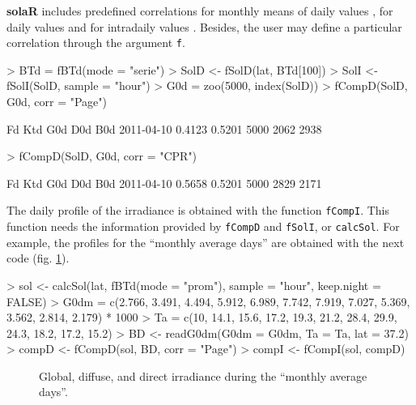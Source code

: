 \documentclass[a4paper]{article}
\renewenvironment{Schunk}{\vspace{\topsep}}{\vspace{\topsep}}
\newcommand{\code}[1]{{\texttt{#1}}}
\newcommand{\pkg}[1]{{\textbf{#1}}}
\begin{document}
\pkg{solaR} includes predefined correlations for monthly means of
daily values \cite{Page1961, Liu.Jordan1960}, for daily values
\cite{Collares-Pereira.Rabl1979,Erbs.Klein.ea1982,Miguel.Bilbao.ea2001}
and for intradaily values \cite{Ridley.Boland.ea2010}.  Besides, the
user may define a particular correlation through the argument
\code{f}.

\begin{Schunk}
\begin{Sinput}
> BTd = fBTd(mode = "serie")
> SolD <- fSolD(lat, BTd[100])
> SolI <- fSolI(SolD, sample = "hour")
> G0d = zoo(5000, index(SolD))
> fCompD(SolD, G0d, corr = "Page")
\end{Sinput}
\begin{Soutput}
               Fd    Ktd  G0d  D0d  B0d
2011-04-10 0.4123 0.5201 5000 2062 2938
\end{Soutput}
\begin{Sinput}
> fCompD(SolD, G0d, corr = "CPR")
\end{Sinput}
\begin{Soutput}
               Fd    Ktd  G0d  D0d  B0d
2011-04-10 0.5658 0.5201 5000 2829 2171
\end{Soutput}
\end{Schunk}

The daily profile of the irradiance is obtained with the function
\code{fCompI}.  This function needs the information provided by
\code{fCompD} and \code{fSolI}, or \code{calcSol}. For example,
the profiles for the ``monthly average days'' are obtained with the next code
(fig. \ref{fig:ComponentesIrradiancia}).

\begin{Schunk}
\begin{Sinput}
> sol <- calcSol(lat, fBTd(mode = "prom"), sample = "hour", keep.night = FALSE)
> G0dm = c(2.766, 3.491, 4.494, 5.912, 6.989, 7.742, 7.919, 7.027, 
     5.369, 3.562, 2.814, 2.179) * 1000
> Ta = c(10, 14.1, 15.6, 17.2, 19.3, 21.2, 28.4, 29.9, 24.3, 18.2, 
     17.2, 15.2)
> BD <- readG0dm(G0dm = G0dm, Ta = Ta, lat = 37.2)
> compD <- fCompD(sol, BD, corr = "Page")
> compI <- fCompI(sol, compD)
\end{Sinput}
\end{Schunk}

%
\begin{figure}
\begin{centering}
\par\end{centering}
\caption{Global, diffuse, and direct irradiance during the ``monthly average days''.\label{fig:ComponentesIrradiancia}}
\end{figure}
\end{document}
